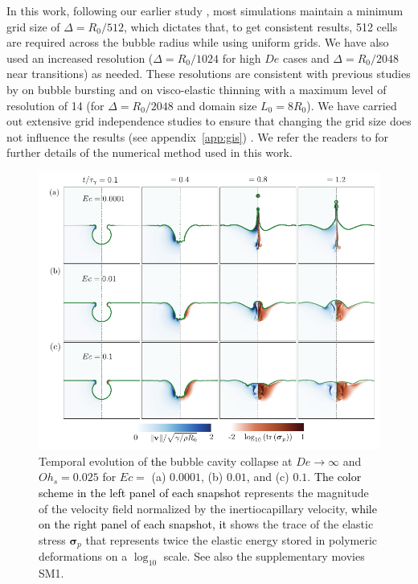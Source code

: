 \documentclass{jfm}
\newcommand{\DL}[1]{{\textcolor{black}{#1}}}
\newcommand{\AO}[1]{{\textcolor{black}{#1}}}
\newcommand{\AKD}[1]{{\textcolor{black}{#1}}}
\newcommand{\oo}{\color{magenta} \normalfont}
\newcommand{\bb}{\color{black} \normalfont}
\begin{document}
In this work, following our earlier study \citep{sanjay2021bursting}, most simulations maintain a minimum grid size of $\Delta = R_0/512$, which dictates that, to get consistent results, 512 cells are required across the bubble radius while using uniform grids.
We have also used an increased resolution ($\Delta = R_0/1024$ for high $De$ cases and $\Delta = R_0/2048$ near transitions) as needed. 
\oo
These resolutions are consistent with previous studies by \citet{berny2020role,berny2021statistics} on bubble bursting and \citet{turkoz2018axisymmetric,turkoz2021simulation} on visco-elastic thinning with a maximum level of resolution of 14 (for $\Delta = R_0/2048$ and domain size $L_0 = 8R_0$).
\bb 
We have carried out extensive grid independence studies to ensure that changing the grid size does not influence the results \oo (see appendix~\ref{app:gis})\bb. We refer the readers to \citet{popinet2015quadtree,VatsalThesis,Sanjay2024code} for further details of the numerical method used in this work.

\begin{figure}
	\includegraphics[width=\textwidth]{Figures/Facets_time_Oh_HighDe/Facets_time_Oh_HighDe_07-eps-converted-to.pdf}
	\caption{Temporal evolution of \DL{the} bubble cavity collapse at $De \to \infty$ and $Oh_s = 0.025$ for $Ec =$ (a) $0.0001$, (b) $0.01$\AKD{,} and (c) $0.1$. \AO{The color scheme in the left panel of each snapshot} represents the magnitude of the velocity field normalized by the inertiocapillary velocity, \AO{while on the right panel of each snapshot, it} shows the trace of the elastic stress $\boldsymbol{\sigma}_p$ that represents twice the elastic energy stored in polymeric deformations on a $\log_{10}$ scale. See also the supplementary movies SM1.}
	\label{facets_time_highDe}
\end{figure}
\end{document}
